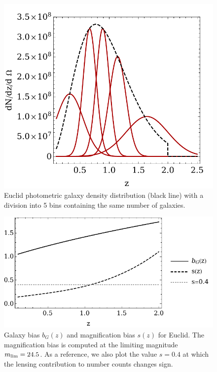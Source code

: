 \begin{figure}[hbtp]
\begin{center}
\includegraphics[width=\textwidth]{figures/chapter-mnu/euclid_5bin.pdf}
\end{center}
\caption{Euclid photometric galaxy density distribution (black line) with a division into 5 bins containing the same number of galaxies.
}
\label{fig:dNdz}
\end{figure}

%
\begin{figure}[hbtp]
\begin{center}
\includegraphics[width=\textwidth]{figures/chapter-mnu/bs.pdf}
\end{center}
\caption{Galaxy bias $b_G(z)$ and magnification bias $s(z)$ for Euclid. The
magnification bias is computed at the limiting magnitude $m_{\rm lim}=24.5$.
As a reference, we also plot the value $s=0.4$ at which the lensing contribution to number counts changes sign.
}
\label{fig:bs}
\end{figure}

